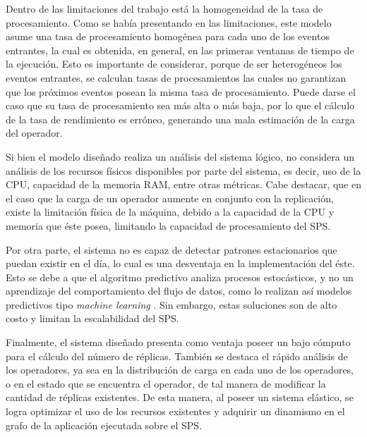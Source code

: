 
Dentro de las limitaciones del trabajo está la homogeneidad de la tasa de procesamiento. Como se había presentando en las limitaciones, este modelo asume una tasa de procesamiento homogénea para cada uno de los eventos entrantes, la cual es obtenida, en general, en las primeras ventanas de tiempo de la ejecución. Esto es importante de considerar, porque de ser heterogéneos los eventos entrantes, se calculan tasas de procesamientos las cuales no garantizan que los próximos eventos posean la misma tasa de procesamiento. Puede darse el caso que su tasa de procesamiento sea más alta o más baja, por lo que el cálculo de la tasa de rendimiento es erróneo, generando una mala estimación de la carga del operador.

Si bien el modelo diseñado realiza un análisis del sistema lógico, no considera un análisis de los recursos físicos disponibles por parte del sistema, es decir, uso de la CPU, capacidad de la memoria RAM, entre otras métricas. Cabe destacar, que en el caso que la carga de un operador aumente en conjunto con la replicación, existe la limitación física de la máquina, debido a la capacidad de la CPU y memoria que éste posea, limitando la capacidad de procesamiento del SPS.

Por otra parte, el sistema no es capaz de detectar patrones estacionarios que puedan existir en el día, lo cual es una desventaja en la implementación del éste. Esto se debe a que el algoritmo predictivo analiza procesos estocásticos, y no un aprendizaje del comportamiento del flujo de datos, como lo realizan así modelos predictivos tipo \textit{machine learning} \citep{bookMohri2012}. Sin embargo, estas soluciones son de alto costo y limitan la escalabilidad del SPS.

Finalmente, el sistema diseñado presenta como ventaja poseer un bajo cómputo para el cálculo del número de réplicas. También se destaca el rápido análisis de los operadores, ya sea en la distribución de carga en cada uno de los operadores, o en el estado que se encuentra el operador, de tal manera de modificar la cantidad de réplicas existentes. De esta manera, al poseer un sistema elástico, se logra optimizar el uso de los recursos existentes y adquirir un dinamismo en el grafo de la aplicación ejecutada sobre el SPS.

